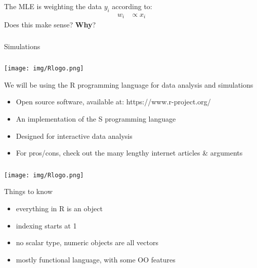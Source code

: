 \begin{frame}[fragile] \frametitle{}

The MLE is weighting the data $y_i$ according to:
\begin{align*}
w_i &\propto x_i
\end{align*}
\pause Does this make sense? {\bf Why}?

\end{frame}

\begin{frame}[fragile] \frametitle{}

\begin{flushright}
{\color{yaleblue}\sc\fontsize{1cm}{0cm}\selectfont Simulations}
\end{flushright}

\end{frame}

\begin{frame}[fragile] \frametitle{}

\noindent
\begin{minipage}{0.5\textwidth}
\texttt{[image: img/Rlogo.png]}
\end{minipage}%
\begin{minipage}{0.5\textwidth}
We will be using the R programming language for data analysis and simulations \\
\begin{itemize}
\item Open source software, available at: https://www.r-project.org/
\item An implementation of the S programming language
\item Designed for interactive data analysis
\item For pros/cons, check out the many lengthy internet articles \& arguments
\end{itemize}
\end{minipage}

\end{frame}


\begin{frame}[fragile] \frametitle{}

\noindent
\begin{minipage}{0.5\textwidth}
\texttt{[image: img/Rlogo.png]}
\end{minipage}%
\begin{minipage}{0.5\textwidth}
Things to know \\
\begin{itemize}
\item everything in R is an object
\item indexing starts at 1
\item no scalar type, numeric objects are all vectors
\item mostly functional language, with some OO features
\end{itemize}
\end{minipage}

\end{frame}

